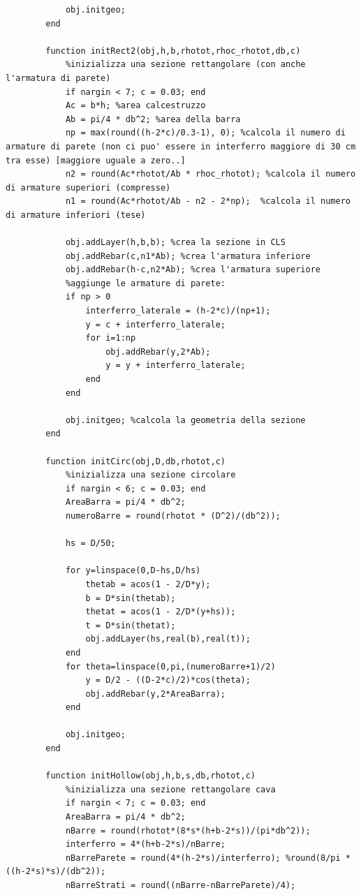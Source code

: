 \documentclass[10pt]{article}
\begin{document}
\begin{lstlisting}
            obj.initgeo;
        end
        
        function initRect2(obj,h,b,rhotot,rhoc_rhotot,db,c)
            %inizializza una sezione rettangolare (con anche l'armatura di parete)
            if nargin < 7; c = 0.03; end
            Ac = b*h; %area calcestruzzo
            Ab = pi/4 * db^2; %area della barra
            np = max(round((h-2*c)/0.3-1), 0); %calcola il numero di armature di parete (non ci puo' essere in interferro maggiore di 30 cm tra esse) [maggiore uguale a zero..]
            n2 = round(Ac*rhotot/Ab * rhoc_rhotot); %calcola il numero di armature superiori (compresse)            
            n1 = round(Ac*rhotot/Ab - n2 - 2*np);  %calcola il numero di armature inferiori (tese)
            
            obj.addLayer(h,b,b); %crea la sezione in CLS
            obj.addRebar(c,n1*Ab); %crea l'armatura inferiore
            obj.addRebar(h-c,n2*Ab); %crea l'armatura superiore
            %aggiunge le armature di parete:
            if np > 0
                interferro_laterale = (h-2*c)/(np+1);
                y = c + interferro_laterale;
                for i=1:np
                    obj.addRebar(y,2*Ab);
                    y = y + interferro_laterale;
                end
            end
            
            obj.initgeo; %calcola la geometria della sezione
        end
        
        function initCirc(obj,D,db,rhotot,c)
            %inizializza una sezione circolare
            if nargin < 6; c = 0.03; end
            AreaBarra = pi/4 * db^2;
            numeroBarre = round(rhotot * (D^2)/(db^2));
            
            hs = D/50;
            
            for y=linspace(0,D-hs,D/hs)
                thetab = acos(1 - 2/D*y);
                b = D*sin(thetab);
                thetat = acos(1 - 2/D*(y+hs));
                t = D*sin(thetat);
                obj.addLayer(hs,real(b),real(t));
            end
            for theta=linspace(0,pi,(numeroBarre+1)/2)
                y = D/2 - ((D-2*c)/2)*cos(theta);
                obj.addRebar(y,2*AreaBarra);
            end
            
            obj.initgeo;
        end
        
        function initHollow(obj,h,b,s,db,rhotot,c)
            %inizializza una sezione rettangolare cava
            if nargin < 7; c = 0.03; end
            AreaBarra = pi/4 * db^2;
            nBarre = round(rhotot*(8*s*(h+b-2*s))/(pi*db^2));
            interferro = 4*(h+b-2*s)/nBarre;
            nBarreParete = round(4*(h-2*s)/interferro); %round(8/pi * ((h-2*s)*s)/(db^2));
            nBarreStrati = round((nBarre-nBarreParete)/4);
            

\end{lstlisting}
\end{document}
